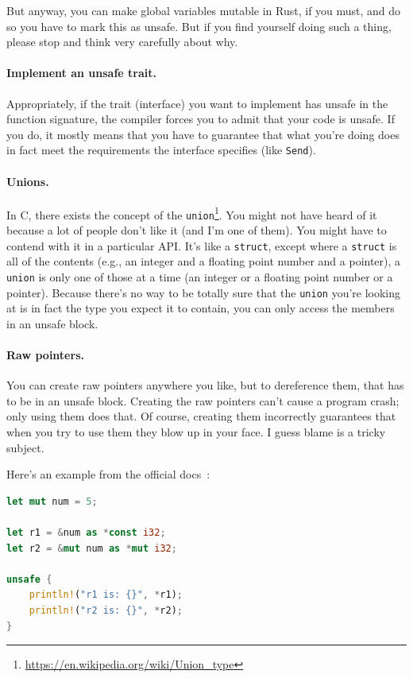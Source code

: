 \documentclass[a4paper]{report}
\begin{document}
But anyway, you can make global variables mutable in Rust, if you must, and do so you have to mark this as unsafe. But if you find yourself doing such a thing, please stop and think very carefully about why.

\paragraph{Implement an unsafe trait.} Appropriately, if the trait (interface) you want to implement has unsafe in the function signature, the compiler forces you to admit that your code is unsafe. If you do, it mostly means that you have to guarantee that what you're doing does in fact meet the requirements the interface specifies (like \texttt{Send}).

\paragraph{Unions.}
In C, there exists the concept of the \texttt{union}\footnote{\url{https://en.wikipedia.org/wiki/Union_type}}. You might not have heard of it because a lot of people don't like it (and I'm one of them). You might have to contend with it in a particular API.  It's like a \texttt{struct}, except where a \texttt{struct} is all of the contents (e.g., an integer and a floating point number and a pointer), a \texttt{union} is only one of those at a time (an integer or a floating point number or a pointer). Because there's no way to be totally sure that the \texttt{union} you're looking at is in fact the type you expect it to contain, you can only access the members in an unsafe block. 


\paragraph{Raw pointers.}
You can create raw pointers anywhere you like, but to dereference them, that has to be in an unsafe block. Creating the raw pointers can't cause a program crash; only using them does that. Of course, creating them incorrectly guarantees that when you try to use them they blow up in your face. I guess blame is a tricky subject.

Here's an example from the official docs~\cite{rustdocs}:
\begin{lstlisting}[language=Rust]
let mut num = 5;

let r1 = &num as *const i32;
let r2 = &mut num as *mut i32;

unsafe {
    println!("r1 is: {}", *r1);
    println!("r2 is: {}", *r2);
}
\end{lstlisting}
\end{document}

